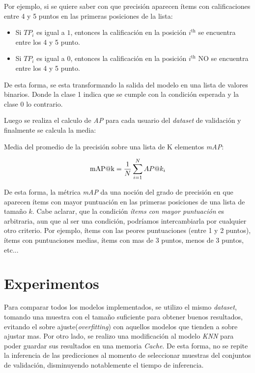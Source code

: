 \documentclass[11pt,a4paper,twoside]{thesis}
\begin{document}
Por ejemplo, si se quiere saber con que precisión aparecen ítems con
calificaciones entre 4 y 5 puntos en las primeras posiciones de la lista:

\begin{itemize}
	\item Si $TP_i$ es igual a $1$, entonces la calificación en la posición
	      $i^\mathrm{th}$ se encuentra entre los 4 y 5 punto.
	\item Si $TP_i$ es igual a $0$, entonces la calificación en la posición
	      $i^\mathrm{th}$ NO se encuentra entre los 4 y 5 punto.
\end{itemize}

De esta forma, se esta transformando la salida del modelo en una lista de
valores binarios. Donde la clase 1 indica que se cumple con la condición
esperada y la clase 0 lo contrario.

Luego se realiza el calculo de \textit{AP\makeatletter@k} para cada usuario del
\textit{dataset} de validación y finalmente se calcula la media:

\begin{description}
	\item[Media del promedio de la precisión sobre una lista de K elementos
	\textit{mAP\makeatletter@k}:]
\end{description}
\begin{equation}
	\operatorname{mAP\makeatletter@k}=\frac{1}{N} \sum_{i=1}^N AP\makeatletter@k_i
\end{equation}

De esta forma, la métrica \textit{mAP\makeatletter@k} da una noción del grado
de precisión en que aparecen ítems con mayor puntuación en las primeras
posiciones de una lista de tamaño $k$. Cabe aclarar, que la condición
\textit{ítems con mayor puntuación} es arbitraria, aun que al ser una
condición, podríamos intercambiarla por cualquier otro criterio. Por ejemplo,
ítems con las peores puntuaciones (entre 1 y 2 puntos), ítems con puntuaciones
medias, ítems con mas de 3 puntos, menos de 3 puntos, etc...

\chapter{Experimentos}

Para comparar todos los modelos implementados, se utilizo el mismo
\textit{dataset}, tomando una muestra con el tamaño suficiente para obtener
buenos resultados, evitando el sobre ajuste(\textit{overfitting}) con aquellos
modelos que tienden a sobre ajustar mas. Por otro lado, se realizo una
modificación al modelo \textit{KNN} para poder guardar sus resultados en una
memoria \textit{Cache}. De esta forma, no se repite la inferencia de las
predicciones al momento de seleccionar muestras del conjuntos de validación,
disminuyendo notablemente el tiempo de inferencia.
\end{document}

